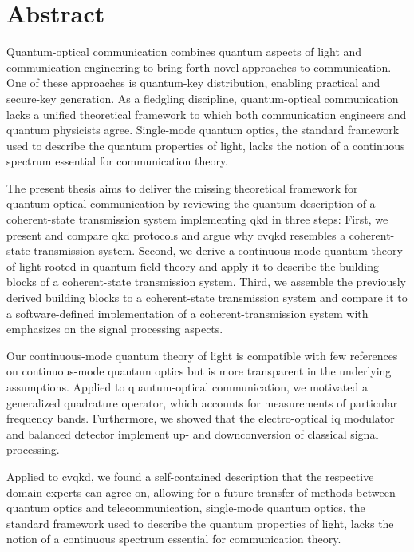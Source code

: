 \section*{Abstract}

Quantum-optical communication combines quantum aspects of light and communication engineering to bring forth novel approaches to communication.
One of these approaches is quantum-key distribution, enabling practical and secure-key generation.
As a fledgling discipline, quantum-optical communication lacks a unified theoretical framework to which both communication engineers and quantum physicists agree.
Single-mode quantum optics, the standard framework used to describe the quantum properties of light, lacks the notion of a continuous spectrum essential for communication theory.

The present thesis aims to deliver the missing theoretical framework for quantum-optical communication by reviewing the quantum description of a coherent-state transmission system implementing \gls{qkd} in three steps:
First, we present and compare \gls{qkd} protocols and argue why \gls{cvqkd} resembles a coherent-state transmission system.
Second, we derive a continuous-mode quantum theory of light rooted in quantum field-theory and apply it to describe the building blocks of a coherent-state transmission system.
Third, we assemble the previously derived building blocks to a coherent-state transmission system and compare it to a software-defined implementation of a coherent-transmission system with emphasizes on the signal processing aspects.

Our continuous-mode quantum theory of light is compatible with few references on continuous-mode quantum optics but is more transparent in the underlying assumptions.
Applied to quantum-optical communication, we motivated a generalized quadrature operator, which accounts for measurements of particular frequency bands.
Furthermore, we showed that the electro-optical \gls{iq} modulator and balanced detector implement up- and downconversion of classical signal processing.

Applied to \gls{cvqkd}, we found a self-contained description that the respective domain experts can agree on, allowing for a future transfer of methods between quantum optics and telecommunication, single-mode quantum optics, the standard framework used to describe the quantum properties of light, lacks the notion of a continuous spectrum essential for communication theory.